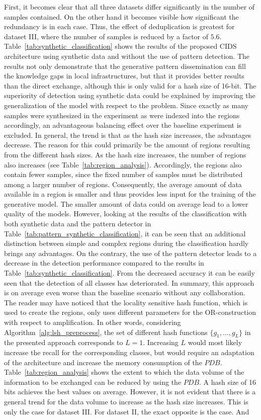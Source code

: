 \documentclass[../../main.tex]{subfiles}
\begin{document}
First, it becomes clear that all three datasets differ significantly in the number of samples contained. On the other hand it becomes visible how significant the redundancy is in each case. Thus, the effect of deduplication is greatest for dataset III, where the number of samples is reduced by a factor of $5.6$. Table~\ref{tab:synthetic_classification} shows the results of the proposed CIDS architecture using synthetic data and without the use of pattern detection. The results not only demonstrate that the generative pattern dissemination can fill the knowledge gaps in local infrastructures, but that it provides better results than the direct exchange, although this is only valid for a hash size of 16-bit. The superiority of detection using synthetic data could be explained by improving the generalization of the model with respect to the problem. Since exactly as many samples were synthesized in the experiment as were indexed into the regions accordingly, an advantageous balancing effect over the baseline experiment is excluded. In general, the trend is that as the hash size increases, the advantages decrease. The reason for this could primarily be the amount of regions resulting from the different hash sizes. As the hash size increases, the number of regions also increases (see Table~\ref{tab:region_analysis}). Accordingly, the regions also contain fewer samples, since the fixed number of samples must be distributed among a larger number of regions. Consequently, the average amount of data available in a region is smaller and thus provides less input for the training of the generative model. The smaller amount of data could on average lead to a lower quality of the models. However, looking at the results of the classification with both synthetic data and the pattern detector in Table~\ref{tab:pattern_synthetic_classification}, it can be seen that an additional distinction between simple and complex regions during the classification hardly brings any advantages. On the contrary, the use of the pattern detector leads to a decrease in the detection performance compared to the results in Table~\ref{tab:synthetic_classification}. From the decreased accuracy it can be easily seen that the detection of all classes has deteriorated. In summary, this approach is on average even worse than the baseline scenario without any collaboration. The reader may have noticed that the locality sensitive hash function, which is used to create the regions, only uses different parameters for the OR-construction with respect to amplification. In other words, considering Algorithm~\ref{alg:lsh_preprocess}, the set of different hash functions $\{g_1, \dots, g_L\}$ in the presented approach corresponds to $L=1$. Increasing $L$ would most likely increase the recall for the corresponding classes, but would require an adaptation of the architecture and increase the memory consumption of the $PDB$. Table~\ref{tab:region_analysis} shows the extent to which the data volume of the information to be exchanged can be reduced by using the $PDB$. A hash size of 16 bits achieves the best values on average. However, it is not evident that there is a general trend for the data volume to increase as the hash size increases. This is only the case for dataset III. For dataset II, the exact opposite is the case. And 
\end{document}
